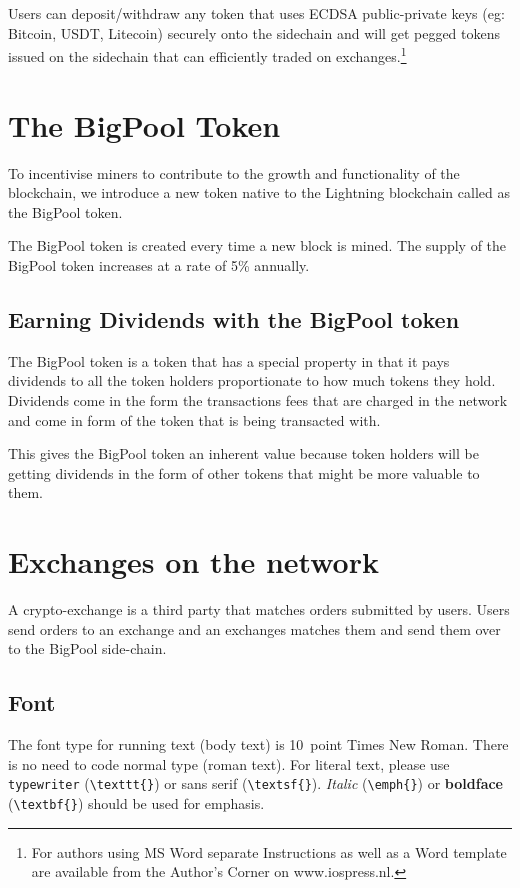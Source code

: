 \documentclass{Bigpool}
\begin{document}
Users can deposit/withdraw any token that uses ECDSA public-private keys (eg: Bitcoin, USDT, Litecoin) securely onto the sidechain and will get pegged tokens issued on the sidechain that can efficiently traded on exchanges.\footnote{For authors using MS Word separate Instructions as well
as a Word template are available from the Author's Corner on
www.iospress.nl.}

\section{The BigPool Token}
To incentivise miners to contribute to the growth and functionality of the blockchain, we introduce a new token native to the Lightning blockchain called as the BigPool token.

The BigPool token is created every time a new block is mined. The supply of the BigPool token increases at a rate of 5\% annually. 

\subsection{Earning Dividends with the BigPool token}
The BigPool token is a token that has a special property in that it pays dividends to all the token holders proportionate to how much tokens they hold. Dividends come in the form the transactions fees that are charged in the network and come in form of the token that is being transacted with.

This gives the BigPool token an inherent value because token holders will be getting dividends in the form of other tokens  that might be more valuable to them. 

\section{Exchanges on the network}
A crypto-exchange is a third party that matches orders submitted by users. Users send orders to an exchange and an exchanges matches them and send them over to the BigPool side-chain.

\subsection{Font}

The font type for running text (body text) is 10~point Times New Roman.
There is no need to code normal type (roman text). For literal text, please use
\texttt{type\-writer} (\verb|\texttt{}|)
or \textsf{sans serif} (\verb|\textsf{}|). \emph{Italic} (\verb|\emph{}|)
or \textbf{boldface} (\verb|\textbf{}|) should be used for emphasis.
\end{document}
